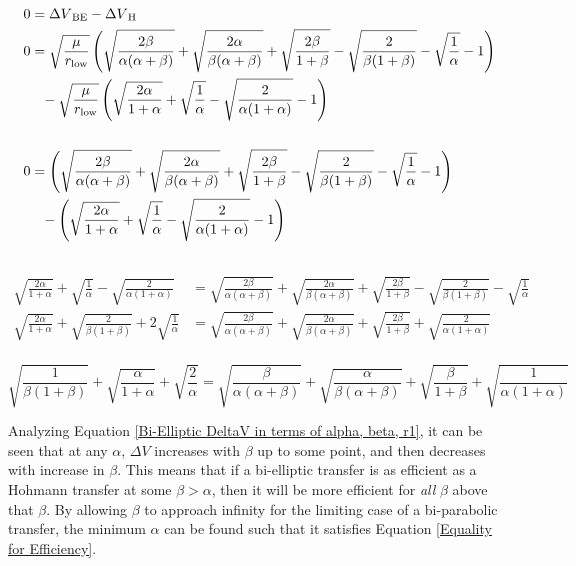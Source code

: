 \documentclass[../basicOrbitalDynamics.tex]{subfiles}
\begin{document}

\begin{align*}
    0 &={\Delta V}_\text{BE}-{\Delta V}_\text{H}\\
    0 &=\sqrt{\frac{\mu}{{r}_\text{low}}}\left(\sqrt{\frac{2\beta}{\alpha(\alpha+\beta)}}+\sqrt{\frac{2\alpha}{\beta(\alpha+\beta)}}+\sqrt{\frac{2\beta}{1+\beta}}-\sqrt{\frac{2}{\beta(1+\beta)}}-\sqrt{\frac{1}{\alpha}}-1\right) \\
      & \phantom{=}-\sqrt{\frac{\mu}{{r}_\text{low}}}\left(\sqrt{\frac{2\alpha}{1+\alpha}}+\sqrt{\frac{1}{\alpha}}-\sqrt{\frac{2}{\alpha(1+\alpha)}}-1\right) \\\\
    0 &=\left(\sqrt{\frac{2\beta}{\alpha(\alpha+\beta)}}+\sqrt{\frac{2\alpha}{\beta(\alpha+\beta)}}+\sqrt{\frac{2\beta}{1+\beta}}-\sqrt{\frac{2}{\beta(1+\beta)}}-\sqrt{\frac{1}{\alpha}}-1\right) \\
      & \phantom{=}-\left(\sqrt{\frac{2\alpha}{1+\alpha}}+\sqrt{\frac{1}{\alpha}}-\sqrt{\frac{2}{\alpha(1+\alpha)}}-1\right) \\\\
\end{align*}
\begin{align*}
    \sqrt{\frac{2\alpha}{1+\alpha}}+\sqrt{\frac{1}{\alpha}}-\sqrt{\frac{2}{\alpha(1+\alpha)}} &=\sqrt{\frac{2\beta}{\alpha(\alpha+\beta)}}+\sqrt{\frac{2\alpha}{\beta(\alpha+\beta)}}+\sqrt{\frac{2\beta}{1+\beta}}-\sqrt{\frac{2}{\beta(1+\beta)}}-\sqrt{\frac{1}{\alpha}} \\
    \sqrt{\frac{2\alpha}{1+\alpha}}+\sqrt{\frac{2}{\beta(1+\beta)}}+2\sqrt{\frac{1}{\alpha}}&=\sqrt{\frac{2\beta}{\alpha(\alpha+\beta)}}+\sqrt{\frac{2\alpha}{\beta(\alpha+\beta)}}+\sqrt{\frac{2\beta}{1+\beta}}+\sqrt{\frac{2}{\alpha(1+\alpha)}} \\
\end{align*}

\begin{equation}\label{Equality for Efficiency}
    \sqrt{\frac{1}{\beta(1+\beta)}}+\sqrt{\frac{\alpha}{1+\alpha}}+\sqrt{\frac{2}{\alpha}}=\sqrt{\frac{\beta}{\alpha(\alpha+\beta)}}+\sqrt{\frac{\alpha}{\beta(\alpha+\beta)}}+\sqrt{\frac{\beta}{1+\beta}}+\sqrt{\frac{1}{\alpha(1+\alpha)}}
\end{equation}

Analyzing Equation  \eqref{Bi-Elliptic DeltaV in terms of alpha, beta, r1}, it can be seen that at any $\alpha$, $\Delta V$ increases with $\beta$ up to some point, and then decreases with increase in $\beta$. This means that if a bi-elliptic transfer is as efficient as a Hohmann transfer at some $\beta>\alpha$, then it will be more efficient for \textit{all} $\beta$ above that $\beta$. By allowing $\beta$ to approach infinity for the limiting case of a bi-parabolic transfer, the minimum $\alpha$ can be found such that it satisfies Equation  \eqref{Equality for Efficiency}.
\end{document}
